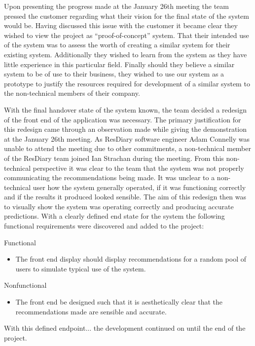 \documentclass{l3proj}
\begin{document}
Upon presenting the progress made at the January 26th meeting the team pressed the customer regarding what their vision for the final state of the system would be. Having discussed this issue with the customer it became clear they wished to view the project as “proof-of-concept” system. That their intended use of the system was to assess the worth of creating a similar system for their existing system. Additionally they wished to learn from the system as they have little experience in this particular field. Finally should they believe a similar system to be of use to their business, they wished to use our system as a prototype to justify the resources required for development of a similar system to the non-technical members of their company.

With the final handover state of the system known, the team decided a redesign of the front end of the application was necessary. The primary justification for this redesign came through an observation made while giving the demonstration at the January 26th meeting. As ResDiary software engineer Adam Connelly was unable to attend the meeting due to other commitments, a non-technical member of the ResDiary team joined Ian Strachan during the meeting. From this non-technical perspective it was clear to the team that the system was not properly communicating the recommendations being made. It was unclear to a non-technical user how the system generally operated, if it was functioning correctly and if the results it produced looked sensible. The aim of this redesign then was to visually show the system was operating correctly and producing accurate predictions. With a clearly defined end state for the system the following functional requirements were discovered and added to the project: 

Functional
\begin{itemize}
\item The front end display should display recommendations for a random pool of users to simulate typical use of the system.
\end{itemize}

Nonfunctional
\begin{itemize}
\item The front end be designed such that it is aesthetically clear that the recommendations made are sensible and accurate.
\end{itemize}

With this defined endpoint... the development continued on until the end of the project.
\end{document}
